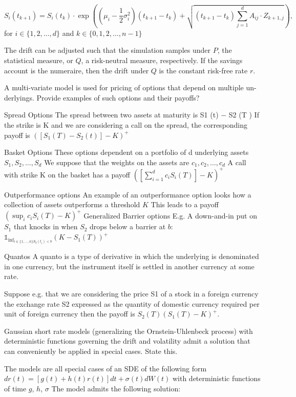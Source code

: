 \[S_{i}(t_{k+1})=S_{i}(t_{k})\cdot \exp \left( (\mu_{i}-\frac{1}{2}\sigma_{i}^{2})(t_{k+1}-t_{k})+\sqrt{(t_{k+1}-t_{k})\sum_{j=1}^{d}A_{ij}\cdot Z_{k+1,j}} \right),\]
for \( i \in \{ 1,2,\dots,d\} \)
and \( k \in \{ 0,1,2,\dots,n-1\} \)

The drift can be adjusted such that the simulation samples under \(P\), the statistical measure, or \(Q\), a risk-neutral measure, respectively.
If the savings account is the numeraire, then the drift under \(Q\) is the constant risk-free rate \(r\).

A multi-variate model is used for pricing of options that depend on multiple un-
derlyings. Provide examples of such options and their payoffs?

Spread Options
The spread between two assets at maturity is S1 (t) − S2 (T )
If the strike is K and we are considering a call on the spread, the corresponding payoff is
\( ([S_1(T) − S_2(t)] − K )^{+} \)

Basket Options
These options dependent on a portfolio of d underlying assets \( S_1, S_2, \dots, S_d \)
We suppose that the weights on the assets are \( c_1, c_2, \dots, c_d \)
A call with strike K on the basket has a payoff
\( ([\sum_{i=1}^{d} c_i S_i(T)] − K )^{+} \)

Outperformance options
An example of an outperformance option looks how a collection of assets outperforms a threshold \( K \)
This leads to a payoff
\( (\sup_{i} c_i S_i(T) -K)^{+}  \)
Generalized Barrier options
E.g.
A down-and-in put on \( S_1 \) that knocks in when \( S_2 \) drops below a barrier at \( b \):
\( \mathbb{1}_{\inf_{i \in \{1, \dots, n\} S_2(t_i) < b  }}(K - S_1(T))^{+} \)

Quantos
A quanto is a type of derivative in which the underlying is denominated in one currency, but the instrument
itself is settled in another currency at some rate.

Suppose e.g. that we are considering
the price S1 of a stock in a foreign currency
the exchange rate S2 expressed as the quantity of domestic currency required per unit of foreign currency
then the payoff is \( S_2(T)(S_1(T) - K)^{+} \).

Gaussian short rate models (generalizing the Ornstein-Uhlenbeck process) with
deterministic functions governing the drift and volatility admit a solution that can
conveniently be applied in special cases. State this.

The models are all special cases of an SDE of the following form
\( dr(t) = [g(t) + h(t)r(t)] dt + \sigma(t) dW(t) \)
with deterministic functions of time \(g\), \(h\), \(\sigma\)
The model admits the following solution:

